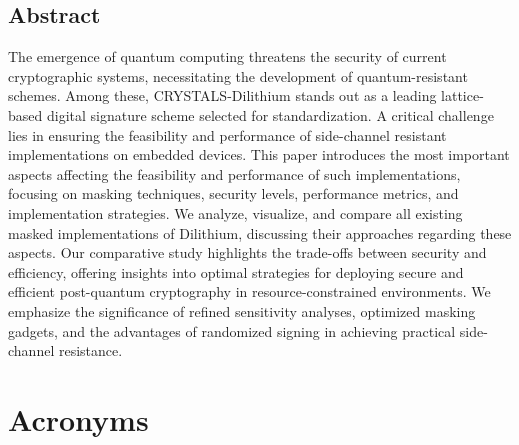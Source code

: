 \documentclass[a4paper,12pt,oneside,openany,headsepline,bibliography=totocnumbered]{scrbook}
\begin{document}


\section*{Abstract}
\thispagestyle{abstract}

The emergence of quantum computing threatens the security of current cryptographic systems, necessitating the development of quantum-resistant schemes. Among these, CRYSTALS-Dilithium stands out as a leading lattice-based digital signature scheme selected for standardization. A critical challenge lies in ensuring the feasibility and performance of side-channel resistant implementations on embedded devices. This paper introduces the most important aspects affecting the feasibility and performance of such implementations, focusing on masking techniques, security levels, performance metrics, and implementation strategies. We analyze, visualize, and compare all existing masked implementations of Dilithium, discussing their approaches regarding these aspects. Our comparative study highlights the trade-offs between security and efficiency, offering insights into optimal strategies for deploying secure and efficient post-quantum cryptography in resource-constrained environments. We emphasize the significance of refined sensitivity analyses, optimized masking gadgets, and the advantages of randomized signing in achieving practical side-channel resistance.

\tableofcontents
\thispagestyle{contents}

\chapter*{Acronyms}
\thispagestyle{acronyms}
\begin{acronym}[PQC]
\end{acronym}








\newpage
\listoffigures
\thispagestyle{listsoffigures}

\listoftables
\thispagestyle{listoftables}

\newpage


\thispagestyle{bibliography}
\end{document}
